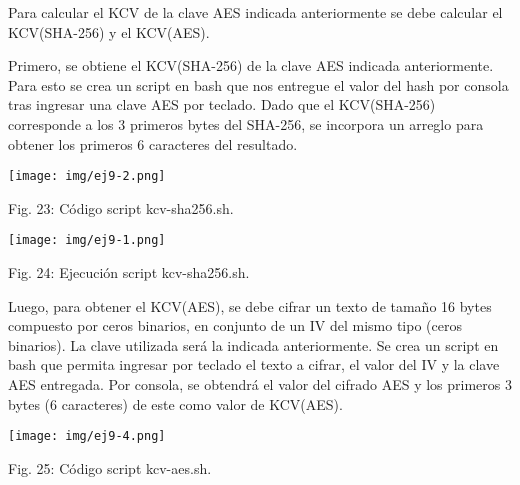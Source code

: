 \documentclass[12pt,oneside,a4paper]{book}
\begin{document}
\hspace{20pt}
Para calcular el KCV de la clave AES indicada anteriormente se debe calcular el KCV(SHA-256) y el KCV(AES).

\vspace{1em}

\hspace{20pt}
Primero, se obtiene el KCV(SHA-256) de la clave AES indicada anteriormente. Para esto se crea un script en bash que nos entregue el valor del hash por consola tras ingresar una clave AES por teclado. Dado que el KCV(SHA-256) corresponde a los 3 primeros bytes del SHA-256, se incorpora un arreglo para obtener los primeros 6 caracteres del resultado.

\vspace{2em}

\begin{center}
    \texttt{[image: img/ej9-2.png]}
    
\vspace{0.1em}
    
    Fig. 23: Código script kcv-sha256.sh.
\end{center}

\vspace{2em}

\begin{center}
    \texttt{[image: img/ej9-1.png]}
    
\vspace{0.1em}
    
    Fig. 24: Ejecución script kcv-sha256.sh.
\end{center}

\vspace{2em}

\hspace{20pt}
Luego, para obtener el KCV(AES), se debe cifrar un texto de tamaño 16 bytes compuesto por ceros binarios, en conjunto de un IV del mismo tipo (ceros binarios). La clave utilizada será la indicada anteriormente. Se crea un script en bash que permita ingresar por teclado el texto a cifrar, el valor del IV y la clave AES entregada. Por consola, se obtendrá el valor del cifrado AES y los primeros 3 bytes (6 caracteres) de este como valor de KCV(AES). 

\vspace{2em}

\begin{center}
    \texttt{[image: img/ej9-4.png]}
    
\vspace{0.1em}
    
    Fig. 25: Código script kcv-aes.sh.
\end{center}
\end{document}
